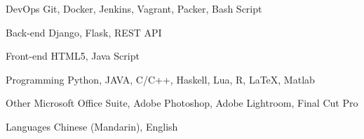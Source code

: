 

\begin{cvskills}

  \cvskill
    {DevOps} %
    {Git, Docker, Jenkins, Vagrant, Packer, Bash Script} %

  \cvskill
    {Back-end} %
    {Django, Flask, REST API} %

  \cvskill
    {Front-end} %
    {HTML5, Java Script} %

  \cvskill
    {Programming} %
    {Python, JAVA, C/C++, Haskell, Lua, R, LaTeX, Matlab} %

  \cvskill
    {Other} %
    {Microsoft Office Suite, Adobe Photoshop, Adobe Lightroom, Final Cut Pro} %


  \cvskill
    {Languages} %
    {Chinese (Mandarin), English} %

\end{cvskills}
